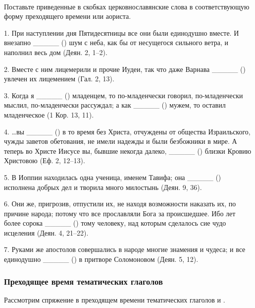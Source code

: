 \documentclass[11pt,a4paper,oneside]{memoir}
\newcommand{\exercise}{}
\begin{document}
\paragraph{\exercise}

Поставьте приведенные в скобках церковнославянские слова в соответствующую форму преходящего времени или аориста.

1. При наступлении дня Пятидесятницы все они были единодушно вместе. И внезапно _____ ({}) шум с неба, как бы от несущегося сильного ветра, и наполнил весь дом (Деян. 2, 1--2).

2. Вместе с ним лицемерили и прочие Иудеи, так что даже Варнава _____ ({}) увлечен их лицемением (Гал. 2, 13).

3. Когда я _____ ({}) младенцем, то по-младенчески говорил, по-младенчески мыслил, по-младенчески рассуждал; а как _____ ({}) мужем, то оставил младенческое (1 Кор. 13, 11).

4. \ldots вы _____ ({}) в то время без Христа, отчуждены от общества Израильского, чужды заветов обетования, не имели надежды и были безбожники в мире. А теперь во Христе Иисусе вы, бывшие некогда далеко, _____ ({}) близки Кровию Христовою (Еф. 2, 12--13).

5. В Иоппии находилась одна ученица, именем Тавифа; она _____ ({}) исполнена добрых дел и творила много милостынь (Деян. 9, 36).

6. Они же, пригрозив, отпустили их, не находя возможности наказать их, по причине народа; потому что все прославляли Бога за происшедшее. Ибо лет более сорока _____ ({}) тому человеку, над которым сделалось сие чудо исцеления (Деян. 4, 21--22).

7. Руками же апостолов совершались в народе многие знамения и чудеса; и все единодушно _____ ({}) в притворе Соломоновом (Деян. 5, 12).

\subsubsection{Преходящее время тематических глаголов}

Рассмотрим спряжение в преходящем времени тематических глаголов {} и {}.
\end{document}
